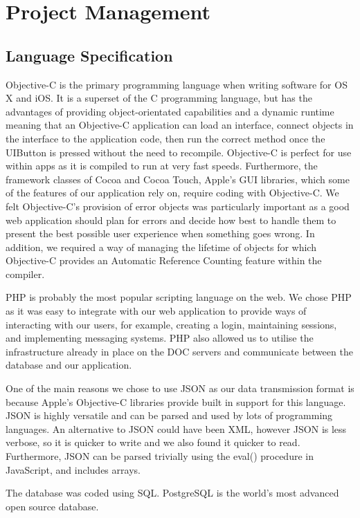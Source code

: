 \documentclass[a4wide, 10pt]{article}
\begin{document}
\section{Project Management}

\subsection{Language Specification}
Objective-C is the primary programming language when writing software for OS X and iOS. It is a superset of the C programming language, but has the advantages of providing object-orientated capabilities and a dynamic runtime meaning that an Objective-C application can load an interface, connect objects in the interface to the application code, then run the correct method once the UIButton is pressed without the need to recompile. Objective-C is perfect for use within apps as it is compiled to run at very fast speeds. Furthermore, the framework classes of Cocoa and Cocoa Touch, Apple's GUI libraries, which some of the features of our application rely on, require coding with Objective-C. We felt Objective-C's provision of error objects was particularly important as a good web application should plan for errors and decide how best to handle them to present the best possible user experience when something goes wrong. In addition, we required a way of managing the lifetime of objects for which Objective-C provides an Automatic Reference Counting feature within the compiler.

PHP is probably the most popular scripting language on the web. We chose PHP as it was easy to integrate with our web application to provide ways of interacting with our users, for example, creating a login, maintaining sessions, and implementing messaging systems. PHP also allowed us to utilise the infrastructure already in place on the DOC servers and communicate between the database and our application. 
 
One of the main reasons we chose to use JSON as our data transmission format is because Apple's Objective-C libraries provide built in support for this language. JSON is highly versatile and can be parsed and used by lots of programming languages. An alternative to JSON could have been XML, however JSON is less verbose, so it is quicker to write and we also found it quicker to read. Furthermore, JSON can be parsed trivially using the eval() procedure in JavaScript, and includes arrays. 

The database was coded using SQL. PostgreSQL is the world's most advanced open source database.
\end{document}

